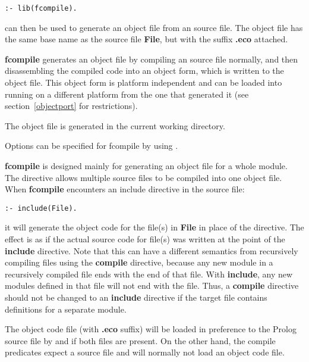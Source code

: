 \begin{verbatim}
:- lib(fcompile).
\end{verbatim}

\noindent
{} can then be used to generate an object file from an
{\eclipse} source file. The object file has the same base name as the source
file {\bf File}, but with the suffix {\bf .eco} attached. 

{\bf fcompile} generates an object file by compiling an {\eclipse} source
file normally, and then disassembling the compiled code into an object
form, which is written to the object file. This object form is platform
independent and can be loaded into {\eclipse} running on a different
platform from the one that generated it (see section~\ref{objectport} for 
restrictions). 

The object file is generated in the current working directory.

Options can be specified for fcompile by using . 


{\bf fcompile} is designed mainly for generating an object file for a whole
module. 
The  directive allows multiple source files to be compiled
into one object file. When {\bf fcompile} encounters an include directive
in the source file:

\begin{verbatim}
:- include(File).
\end{verbatim}

\noindent
it will generate the object code for the file(s) in {\bf File} in place of
the directive. The effect is as if the actual source code for file(s) was
written at the point of the {\bf include} directive. Note that this can
have a different semantics from recursively compiling files using the {\bf
compile} directive, because any new module in a recursively compiled file
ends with the end of that file. With {\bf include}, any new modules defined
in that file will not end with the file. Thus, a {\bf compile}
directive should not be changed to an {\bf include} directive if the
target file contains definitions for a separate module.

The object code file (with {\bf .eco} suffix) will be loaded in preference
to the Prolog source file by  and  if both
files are present. On the other hand, the compile predicates expect a
source file and will normally not load an object code file. 

